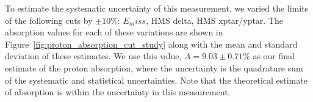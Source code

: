 To estimate the systematic uncertainty of this measurement, we varied the limits
of the following cuts by $\pm10\%$: $E_miss$, HMS delta, HMS xptar/yptar.
The absorption values for each of these variations are shown in
Figure~\ref{fig:proton_absorption_cut_study} along with the mean and standard
deviation of these estimates.
We use this value, $A=9.03\pm0.71\%$ as our final estimate of the proton
absorption, where the uncertainty is the quadrature sum of the systematic and
statistical uncertainties.
Note that the theoretical estimate of absorption is within the uncertainty in
this measurement.


